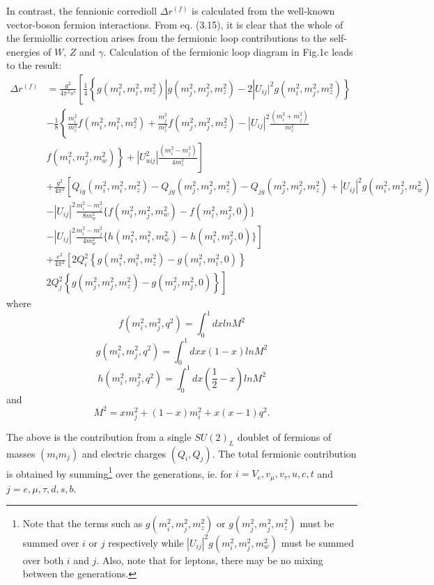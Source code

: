 {In contrast, the fennionic corredioll $\Delta r^{(f)}$ is calculated from the well-known
vector-boson fermion interactions. From eq. (3.15), it is clear that the whole
of the fermiollic correction arises from the fermionic loop contributions to the
self-energies of $W$, $Z$ and $\gamma$. Calculation of the fermionic loop diagram in Fig.1c leads to the result:
{\fontsize{8}{10}\selectfont
\begin{align*}
\Delta r^{(f)} &= \frac{g^{2}}{4\pi^{2}s^{s}}\left[\frac{1}{4}\left\{g(m^{2}_{i}, m_{i}^{2},m_{z}^{2}) | g(m^{2}_{j}, m_{j}^{2},m_{z}^{2})-2 |U_{ij}|^{2} g(m^{2}_{i}, m_{j}^{2},m_{z}^{2})  \right\}\right.\\
			   &-\frac{1}{8} \left\{\frac{m_{i}^{2}}{m^{2}_{z}}f(m^{2}_{i}, m^{2}_{i}, m^{2}_{z}) + \frac{m^{2}_{j}}{m^{2}_{z}}f(m^{2}_{j},m^{2}_{j},m^{2}_{z})-|U_{ij}|^{2} \frac{(m^{2}_{i}+ m^{2}_{j})}{m^{2}_{z}}\right.\\		   
               & \left.\left. f(m^{2}_{i},m^{2}_{j},m_{w}^{2})\right\} + |U_{uij}^{2}| \frac{(m_{i}^{2}-m^{2}_{j})}{4m^{2}_{z}}  \right]\\
               & + \frac{g^{2}}{4 \pi^{2}} \left[ Q_{i g}(m^{2}_{i}, m^{2}_{i},m_{z}^{2}) -Q_{jg}(m^{2}_{j},m_{j}^{2},m_{z}^{2}) -Q_{jg}(m^{2}_{j},m^{2}_{j},m^{2}_{z}) + |U_{ij}|^{2}g(m^{2}_{i}, m_{j}^{2},m^{2}_{w})\right.\\
 &-|U_{ij}|^{2}\frac{m^{2}_{i}-m^{2}_{j}}{8m^{2}_{w}}\{f(m^{2}_{i},m_{j}^{2},m^{2}_{w})-f(m^{2}_{i},m^{2}_{j}, 0) \}\\
              &\left. -|U_{ij}|^{2}\frac{m^{2}_{i}-m^{2}_{j}}{4m^{2}_{w}} \{ h(m^{2}_{i}, m^{2}_{i}, m^{2}_{w})-h(m^{2}_{i}, m^{2}_{j},0)\}\right]\\
              &+ \frac{e^{2}}{4 \pi^{2}} \left[ 2Q_{i}^{2} \left\{g(m^{2}_{i}, m_{i}^{2}, m^{2}_{z}) - g(m^{2}_{i}, m^{2}_{i}, 0)\right\}\right.\\
              & \left. 2Q_{j}^{2}\left\{g(m^{2}_{j},m^{2}_{j},m^{2}_{z})-g(m^{2}_{j},m^{2}_{j},0) \right\}\right]\tag{3.19}
\end{align*}}
where
$$
f(m^{2}_{i},m^{2}_{j}, q^{2}) =\int^{1}_{0}dx ln M^{2}
$$
$$
g(m^{2}_{i},m^{2}_{j}, q^{2})= \int^{1}_{0}dx x(1-x)ln M^{2}
$$
$$
h(m^{2}_{i},m^{2}_{j}, q^{2})=\int^{1}_{0}dx \left(\frac{1}{2}-x \right) ln M^{2}
$$
and
$$
M^{2}= xm^{2}_{j}+ (1-x)m^{2}_{i} +x(x-1)q^{2}.
$$

The above is the contribution from a single $SU(2)_{L}$ doublet of fermions of
masses $(m_{i} m_{j})$ and electric charges $(Q_{i}, Q_{j})$. The total fermionic contribution
is obtained by summing\footnote{Note that the terms such as $g(m^{2}_{i}, m^{2}_{j}, m^{2}_{z})$ or $g(m^{2}_{j},m^{2}_{j}, m^{2}_{z})$ must be summed over $i$ or $j$ respectively while $|U_{ij}|^{2}g(m^{2}_{i},m^{2}_{j}, m^{2}_{w})$ must be summed over both $i$ and $j$. Also, note that for leptons, there may be no mixing between the generations.} over the generations, ie. for $i = V_{e}, v_{\mu}, v_{\tau}, u, c, t$ and $j=e, \mu,\tau,d,s, b$.

}
